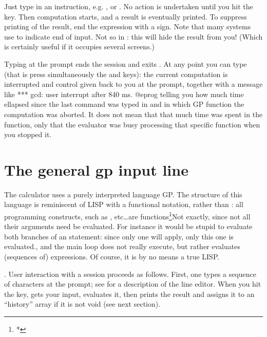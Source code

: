
Just type in an instruction, e.g. , or . No action is
undertaken until you hit the  key. Then computation starts, and
a result is eventually printed. To suppress printing of the result, end the
expression with a \kbd{;} sign. Note that many systems use \kbd{;} to
indicate end of input. Not so in : this will hide the result from you!
(Which is certainly useful if it occupies several screens.)


Typing  at the prompt ends the session and exits . At any
point you can type  (that is press simultaneously the
 and  keys): the current computation is interrupted and
control given back to you at the  prompt, together with a message
like
\bprog
  *** gcd: user interrupt after 840 ms.
@eprog\noindent
telling you how much time ellapsed since the last command was typed in and
in which GP function the computation was aborted. It does not mean that that
much time was spent in the function, only that the evaluator was busy
processing that specific function when you stopped it.

\section{The general gp input line}

The  calculator uses a purely interpreted language GP. The structure
of this language is reminiscent of LISP with a functional notation,
 rather than : all programming constructs,
such as ,  etc\dots are functions\footnote{*}{Not exactly,
since not all their arguments need be evaluated. For instance it would be
stupid to evaluate both branches of an  statement: since only one
will apply, only this one is evaluated.}, and the main loop does not really
execute, but rather evaluates (sequences of) expressions. Of course, it is by
no means a true LISP.

. User interaction with a  session proceeds as
follows. First, one types a sequence of characters at the  prompt;
see  for a description of the line editor. When you hit
the  key,  gets your input, evaluates it, then prints
the result and assigns it to an ``history'' array if it is not void (see
next section).

